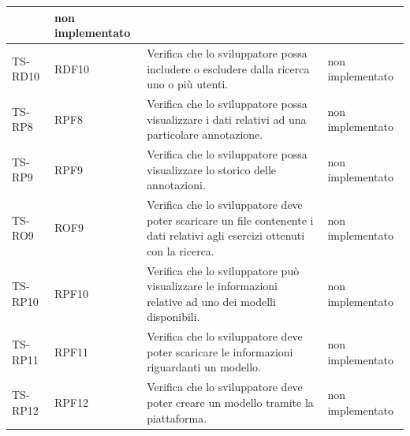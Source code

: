 {\begin{longtable}{|>{\centering\arraybackslash}m{1.6cm}|>{\centering\arraybackslash}m{1.7cm}|m{6.41cm}|>{\centering\arraybackslash}m{3.1cm}|}
		& non implementato\\ \hline
		\rowcolor{LightGray}
		TS-RD10		
		& RDF10 
		& Verifica che lo sviluppatore possa includere o escludere dalla ricerca uno o più utenti. 
		& non implementato\\ \hline 
		\rowcolor{white}
		TS-RP8		
		& RPF8 
		& Verifica che lo sviluppatore possa visualizzare i dati relativi ad una particolare annotazione. 		
		& non implementato\\ \hline
		\rowcolor{LightGray}
		TS-RP9		
		& RPF9 
		& Verifica che lo sviluppatore possa visualizzare lo storico delle annotazioni. 
		&  non implementato\\ \hline
		\rowcolor{white}
		TS-RO9
		& ROF9 
		& Verifica che lo sviluppatore deve poter scaricare un file contenente i dati relativi agli esercizi ottenuti con la ricerca.
		& non implementato\\ \hline
		\rowcolor{LightGray}
		TS-RP10		
		& RPF10 
		& Verifica che lo sviluppatore può visualizzare le informazioni relative ad uno dei modelli disponibili. 
		& non implementato\\ \hline
		\rowcolor{white}
		TS-RP11		
		& RPF11 
		& Verifica che lo sviluppatore deve poter scaricare le informazioni riguardanti un modello. 
		& non implementato\\ \hline
		\rowcolor{LightGray}
		TS-RP12		
		& RPF12 
		& Verifica che lo sviluppatore deve poter creare un modello tramite la piattaforma. 
		& non implementato\\ \hline	
		

\end{longtable}}
